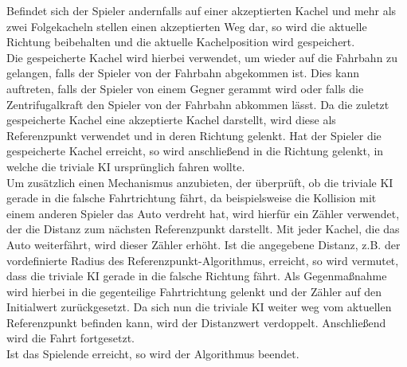 Befindet sich der Spieler andernfalls auf einer akzeptierten Kachel und mehr als zwei Folgekacheln stellen einen akzeptierten Weg dar, so wird die aktuelle Richtung beibehalten und die aktuelle Kachelposition wird gespeichert.\\
Die gespeicherte Kachel wird hierbei verwendet, um wieder auf die Fahrbahn zu gelangen, falls der Spieler von der Fahrbahn abgekommen ist. Dies kann auftreten, falls der Spieler von einem Gegner gerammt wird oder falls die Zentrifugalkraft den Spieler von der Fahrbahn abkommen lässt. Da die zuletzt gespeicherte Kachel eine akzeptierte Kachel darstellt, wird diese als Referenzpunkt verwendet und in deren Richtung gelenkt. Hat der Spieler die gespeicherte Kachel erreicht, so wird anschließend in die Richtung gelenkt, in welche die triviale KI ursprünglich fahren wollte.\\
Um zusätzlich einen Mechanismus anzubieten, der überprüft, ob die triviale KI gerade in die falsche Fahrtrichtung fährt, da beispielsweise die Kollision mit einem anderen Spieler das Auto verdreht hat, wird hierfür ein Zähler verwendet, der die Distanz zum nächsten Referenzpunkt darstellt. Mit jeder Kachel, die das Auto weiterfährt, wird dieser Zähler erhöht. Ist die angegebene Distanz, z.B. der vordefinierte Radius des Referenzpunkt-Algorithmus, erreicht, so wird vermutet, dass die triviale KI gerade in die falsche Richtung fährt. Als Gegenmaßnahme wird hierbei in die gegenteilige Fahrtrichtung gelenkt und der Zähler auf den Initialwert zurückgesetzt. Da sich nun die triviale KI weiter weg vom aktuellen Referenzpunkt befinden kann, wird der Distanzwert verdoppelt. Anschließend wird die Fahrt fortgesetzt.\\
Ist das Spielende erreicht, so wird der Algorithmus beendet.
